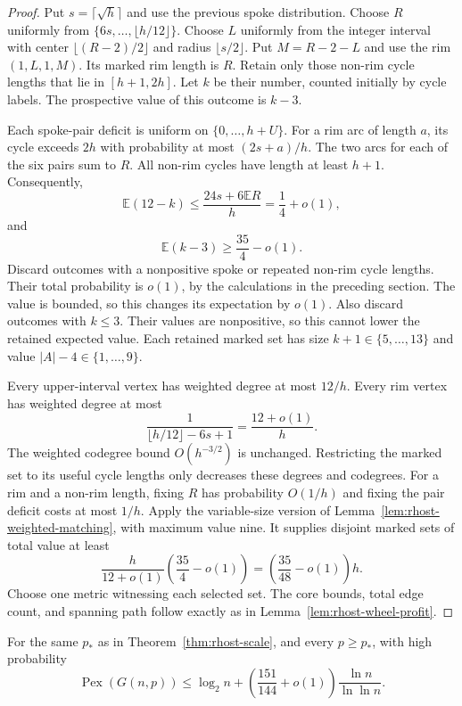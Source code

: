 \begin{proof}
Put $s=\lceil\sqrt h\rceil$ and use the previous spoke distribution.
Choose $R$ uniformly from $\{6s,\ldots,\lfloor h/12\rfloor\}$.
Choose $L$ uniformly from the integer interval with center $\lfloor(R-2)/2\rfloor$ and radius $\lfloor s/2\rfloor$.
Put $M=R-2-L$ and use the rim $(1,L,1,M)$.
Its marked rim length is $R$.
Retain only those non-rim cycle lengths that lie in $[h+1,2h]$.
Let $k$ be their number, counted initially by cycle labels.
The prospective value of this outcome is $k-3$.

Each spoke-pair deficit is uniform on $\{0,\ldots,h+U\}$.
For a rim arc of length $a$, its cycle exceeds $2h$ with probability at most $(2s+a)/h$.
The two arcs for each of the six pairs sum to $R$.
All non-rim cycles have length at least $h+1$.
Consequently,
\[
 \mathbb E(12-k)\le\frac{24s+6\mathbb E R}{h}
 =\frac14+o(1),
\]
and
\[
 \mathbb E(k-3)\ge\frac{35}{4}-o(1).
\]
Discard outcomes with a nonpositive spoke or repeated non-rim cycle lengths.
Their total probability is $o(1)$, by the calculations in the preceding section.
The value is bounded, so this changes its expectation by $o(1)$.
Also discard outcomes with $k\le3$.
Their values are nonpositive, so this cannot lower the retained expected value.
Each retained marked set has size $k+1\in\{5,\ldots,13\}$ and value $|A|-4\in\{1,\ldots,9\}$.

Every upper-interval vertex has weighted degree at most $12/h$.
Every rim vertex has weighted degree at most
\[
 \frac1{\lfloor h/12\rfloor-6s+1}=\frac{12+o(1)}h.
\]
The weighted codegree bound $O(h^{-3/2})$ is unchanged.
Restricting the marked set to its useful cycle lengths only decreases these degrees and codegrees.
For a rim and a non-rim length, fixing $R$ has probability $O(1/h)$ and fixing the pair deficit costs at most $1/h$.
Apply the variable-size version of Lemma~\ref{lem:rhost-weighted-matching}, with maximum value nine.
It supplies disjoint marked sets of total value at least
\[
 \frac{h}{12+o(1)}\left(\frac{35}{4}-o(1)\right)
 =\left(\frac{35}{48}-o(1)\right)h.
\]
Choose one metric witnessing each selected set.
The core bounds, total edge count, and spanning path follow exactly as in Lemma~\ref{lem:rhost-wheel-profit}.
\end{proof}

\begin{theorem}\label{thm:rhost-one-fifty-one}
For the same $p_*$ as in Theorem~\ref{thm:rhost-scale}, and every $p\ge p_*$,
with high probability
\[
 \operatorname{Pex}(G(n,p))
 \le\log_2n+\left(\frac{151}{144}+o(1)\right)\frac{\ln n}{\ln\ln n}.
\]
\end{theorem}


